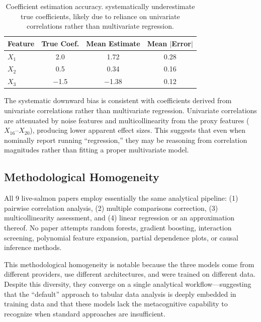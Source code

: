 \begin{table}[t]
    \centering
    \caption{Coefficient estimation accuracy. \aiscientists systematically underestimate true coefficients, likely due to reliance on univariate correlations rather than multivariate regression.}
    \begin{tabular}{@{}lccc@{}}
        \toprule
        \textbf{Feature} & \textbf{True Coef.} & \textbf{Mean Estimate} & \textbf{Mean $|$Error$|$} \\
        \midrule
        $X_1$ & 2.0 & 1.72 & 0.28 \\
        $X_2$ & 0.5 & 0.34 & 0.16 \\
        $X_3$ & $-$1.5 & $-$1.38 & 0.12 \\
        \bottomrule
    \end{tabular}
    \label{tab:coef}
\end{table}

The systematic downward bias is consistent with coefficients derived from univariate correlations rather than multivariate regression.
Univariate correlations are attenuated by noise features and multicollinearity from the proxy features ($X_{16}$--$X_{20}$), producing lower apparent effect sizes.
This suggests that even when \aiscientists nominally report running ``regression,'' they may be reasoning from correlation magnitudes rather than fitting a proper multivariate model.

\subsection{Methodological Homogeneity}
\label{sec:methods}

All 9 live-salmon papers employ essentially the same analytical pipeline:
(1) pairwise correlation analysis,
(2) multiple comparisons correction,
(3) multicollinearity assessment, and
(4) linear regression or an approximation thereof.
No paper attempts random forests, gradient boosting, interaction screening, polynomial feature expansion, partial dependence plots, or causal inference methods.

This methodological homogeneity is notable because the three models come from different providers, use different architectures, and were trained on different data.
Despite this diversity, they converge on a single analytical workflow---suggesting that the ``default'' approach to tabular data analysis is deeply embedded in \llm training data and that these models lack the metacognitive capability to recognize when standard approaches are insufficient.
